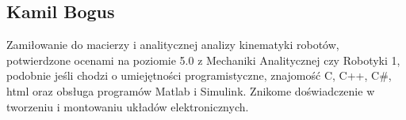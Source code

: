 \subsection{Kamil Bogus}
Zamiłowanie do macierzy i analitycznej analizy kinematyki robotów, potwierdzone ocenami na poziomie 5.0 z Mechaniki Analitycznej czy Robotyki 1, podobnie jeśli chodzi o umiejętności programistyczne, znajomość C, C++, C#, html oraz obsługa programów Matlab i Simulink. Znikome doświadczenie w tworzeniu i montowaniu układów elektronicznych.
